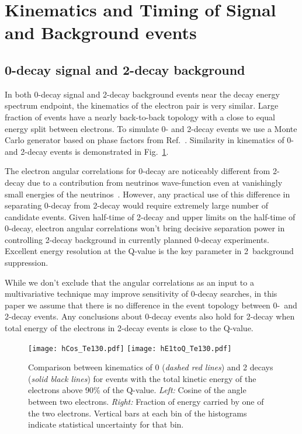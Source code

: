 \section{Kinematics and Timing of Signal and Background events}
\label{sec:kinematics_and_timing}

\subsection{0\nbb-decay signal and 2\nbb-decay background}

In both 0\nbb-decay signal and 2\nbb-decay background events near the decay energy spectrum endpoint, the kinematics of the
electron pair is very similar. Large fraction of events have a nearly back-to-back topology with a close to 
equal energy split between electrons. To simulate 0\nbb- and 2\nbb-decay events we use a Monte Carlo generator based on phase 
factors from Ref.~\cite{Jenni}. Similarity in kinematics of 0\nbb- and 2\nbb-decay events is demonstrated in Fig.~\ref{fig:Kinematics}.

The electron angular correlations for 0\nbb-decay are noticeably different from 2\nbb-decay due to a contribution from
neutrinos wave-function even at vanishingly small energies of the neutrinos~\cite{Jenni}. However, any practical use of this difference 
in separating 0\nbb-decay from 2\nbb-decay would require extremely large number of candidate events. Given half-time of 2\nbb-decay 
and upper limits on the half-time of 0\nbb-decay, electron angular correlations won't bring decisive separation power in controlling 
2\nbb-decay background in currently planned 0\nbb-decay experiments. Excellent energy resolution at the Q-value is the key parameter
in 2\nbb~background suppression.

While we don't exclude that the angular correlations as an input to a multivariative technique may improve sensitivity of 0\nbb-decay 
searches, in this paper we assume that there is no difference in the event topology between 0\nbb-~and 2\nbb-decay events. Any conclusions 
about 0\nbb-decay events also hold for 2\nbb-decay when total energy of the electrons in 2\nbb-decay events is close to the Q-value.


\begin{figure}[ht]
  \centering
  \texttt{[image: hCos\_Te130.pdf]}
  \texttt{[image: hE1toQ\_Te130.pdf]}
  \caption{Comparison between kinematics of 0{\nbb} (\emph{dashed red
      lines}) and 2{\nbb} decays (\emph{solid black lines}) for events
    with the total kinetic energy of the electrons above 90\% of the
    Q-value. \emph{Left:} Cosine of the angle between two
    electrons. \emph{Right:} Fraction of energy carried by one of the
    two electrons. Vertical bars at each bin of the histograms indicate
    statistical uncertainty for that bin.}
  \label{fig:Kinematics}
\end{figure}



